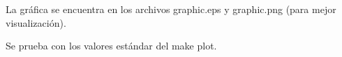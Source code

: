 La gráfica se encuentra en los archivos graphic.eps y graphic.png (para mejor visualización).

Se prueba con los valores estándar del make plot.